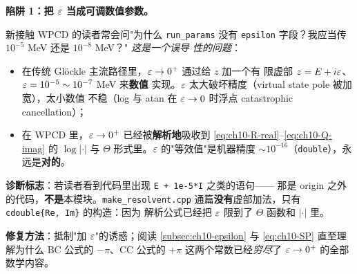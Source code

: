 \begin{pitfallbox}[label=box:ch10-pitfall-epsilon]
\textbf{陷阱 1：把 \(\varepsilon\) 当成可调数值参数。}

新接触 WPCD 的读者常会问"为什么 \texttt{run\_params} 没有 \texttt{epsilon}
字段？我应当传 \(10^{-5}\) MeV 还是 \(10^{-8}\) MeV？" \emph{这是一个误导
性的问题}：

\begin{itemize}
  \item 在传统 Glöckle 主流路径里，\(\varepsilon \to 0^{+}\) 通过给 \(z\) 加一个有
        限虚部 \(z = E + i\varepsilon\)、\(\varepsilon = 10^{-5} \sim 10^{-7}\) MeV 来\textbf{数值}
        实现。\(\varepsilon\) 太大破坏精度（virtual state pole 被加宽），太小数值
        不稳（log 与 atan 在 \(\varepsilon \to 0\) 时浮点 catastrophic
        cancellation）；
  \item 在 WPCD 里，\(\varepsilon \to 0^{+}\) 已经被\textbf{解析地}吸收到
        \cref{eq:ch10-R-real}--\cref{eq:ch10-Q-imag} 的 \(\log|\cdot|\) 与
        \(\Theta\) 形式里。\(\varepsilon\) 的"等效值"是机器精度
        \(\sim 10^{-16}\)（\texttt{double}），永远是\textbf{对的}。
\end{itemize}

\textbf{诊断标志}：若读者看到代码里出现 \texttt{E + 1e-5*I} 之类的语句——
那是 origin 之外的代码，\textbf{不是}本模块。\texttt{make\_resolvent.cpp}
通篇\textbf{没有}虚部加法，只有 \texttt{cdouble\{Re, Im\}} 的构造：因为
解析公式已经把 \(\varepsilon\) 限到了 \(\Theta\) 函数和 \(|\cdot|\) 里。

\textbf{修复方法}：抵制"加 \(\varepsilon\)"的诱惑；阅读
\cref{subsec:ch10-epsilon} 与 \cref{eq:ch10-SP} 直至理解为什么 BC 公式的
\(-\pi\)、CC 公式的 \(+\pi\) 这两个常数已经\emph{穷尽}了 \(\varepsilon \to 0^{+}\)
的全部数学内容。
\end{pitfallbox}

